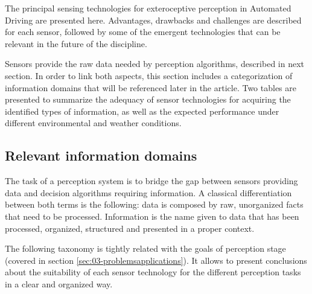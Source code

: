 
The principal sensing technologies for exteroceptive perception in Automated 
Driving are presented here. Advantages, drawbacks and 
challenges are described for each sensor, followed by some of the emergent 
technologies that can be relevant in the future of the discipline.

Sensors provide the raw data needed by perception algorithms, described in
next section. In order to link both aspects, this section includes a
categorization of information domains that will be referenced later in the
article.
Two tables are presented to summarize the adequacy of sensor technologies for 
acquiring the identified types of information, as well as the expected
performance under different environmental and weather conditions.

\subsection{Relevant information domains}

The task of a perception system is to bridge the gap between sensors providing 
data and decision algorithms requiring information.
A classical differentiation between both terms is the following: data is 
composed by raw, unorganized facts that need to be processed. 
Information is the name given to data that has been processed, organized, 
structured and presented in a proper context.

The following taxonomy is tightly related with the goals of perception stage
(covered in section \ref{sec:03-problemsapplications}). It allows to
present conclusions about the suitability of each sensor technology for
the different perception tasks in a clear and organized way.

